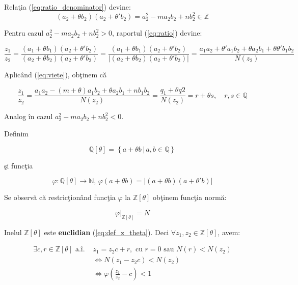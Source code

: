 \documentclass[12t]{article}
\begin{document}
Relaţia (\ref{eq:ratio_denominator}) devine:
\begin{equation}
    (a_2 + \theta b_2)(a_2 + \theta' b_2) = a_2^2 - m a_2 b_2 + n b_2^2 \in \mathbb{Z}
\end{equation}

Pentru cazul $a_2^2 - m a_2 b_2 + n b_2^2 > 0$, raportul (\ref{eq:ratio}) devine:

\begin{equation} \label{eq:ratio_a}
    \frac{z_1}{z_2} = \frac{(a_1 + \theta b_1)(a_2 + \theta' b_2)}{(a_2 + \theta b_2)(a_2 + \theta' b_2)} 
    =  \frac{(a_1 + \theta b_1)(a_2 + \theta' b_2)}{|(a_2 + \theta b_2)(a_2 + \theta' b_2)|} 
    = \frac{a_1 a_2 + \theta' a_1 b_2 + \theta a_2 b_1 + \theta \theta' b_1b_2}{N(z_2)}
\end{equation}

Aplicând (\ref{eq:viete}), obţinem că

\begin{equation} \label{eq:ratio_a_viete}
    \frac{z_1}{z_2} =
    \frac{a_1 a_2 - (m + \theta) a_1 b_2 + \theta a_2 b_1 + n b_1b_2}{N(z_2)} =
    \frac{q_1 + \theta q2}{N(z_2)} = 
    r + \theta s, \quad r, s \in \mathbb{Q}
\end{equation}

Analog în cazul $a_2^2 - m a_2 b_2 + n b_2^2 < 0$.

Definim

\begin{equation} \label{eq:def_q_theta}
    \mathbb{Q}[\theta] = \left\{ a + \theta b \,|\, a, b \in \mathbb{Q} \right\}
\end{equation}

şi funcţia

\begin{equation} \label{eq:def_phi}
    \varphi : \mathbb{Q}[\theta] \to \mathbb{N}, \, \varphi(a + \theta b) = |(a + \theta b)(a + \theta' b)|
\end{equation}

Se observă că restricţionând funcţia $\varphi$ la $\mathbb{Z}[\theta]$ obţinem funcţia normă:

\begin{equation} \label{eq:phi_restricted_z}
    \left.\varphi\right|_{\mathbb{Z}[\theta]} = N
\end{equation}

Inelul $\mathbb{Z}[\theta]$ este \textbf{euclidian} (\ref{eq:def_z_theta}). Deci $\forall z_1, z_2 \in \mathbb{Z}[\theta] $, avem:

\begin{equation} \label{eq:z_theta_euclidean}
    \begin{split}
        \exists c, r \in \mathbb{Z}[\theta] \text{ a.î. }
        & z_1 = z_2 c + r, \text{ cu } r = 0 \text{ sau } N(r) < N(z_2) \\
        &\Leftrightarrow N(z_1 - z_2 c) < N(z_2) \\
        &\Leftrightarrow \varphi \left(\frac{z_1}{z_2} - c\right) < 1
    \end{split}
\end{equation}
\end{document}
